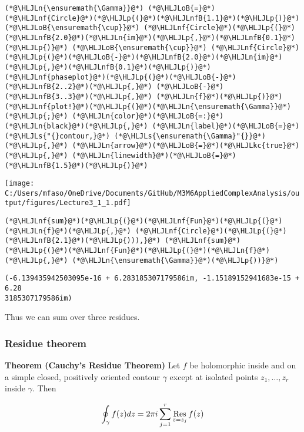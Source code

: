 \documentclass[12pt,landscape]{article}
\newcommand{\HLJLkc}[1]{\textcolor[RGB]{59,151,46}{\textit{#1}}}
\newcommand{\HLJLn}[1]{#1}
\newcommand{\HLJLnf}[1]{\textcolor[RGB]{66,102,213}{#1}}
\newcommand{\HLJLs}[1]{\textcolor[RGB]{201,61,57}{#1}}
\newcommand{\HLJLnfB}[1]{\textcolor[RGB]{59,151,46}{#1}}
\newcommand{\HLJLoB}[1]{\textcolor[RGB]{102,102,102}{\textbf{#1}}}
\newcommand{\HLJLp}[1]{#1}
\def\cent#1{\begin{center}#1\end{center} }
\begin{document}
{\begin{lstlisting}
(*@\HLJLn{\ensuremath{\Gamma}}@*) (*@\HLJLoB{=}@*) (*@\HLJLnf{Circle}@*)(*@\HLJLp{(}@*)(*@\HLJLnfB{1.1}@*)(*@\HLJLp{)}@*) (*@\HLJLoB{\ensuremath{\cup}}@*) (*@\HLJLnf{Circle}@*)(*@\HLJLp{(}@*)(*@\HLJLnfB{2.0}@*)(*@\HLJLn{im}@*)(*@\HLJLp{,}@*)(*@\HLJLnfB{0.1}@*)(*@\HLJLp{)}@*) (*@\HLJLoB{\ensuremath{\cup}}@*) (*@\HLJLnf{Circle}@*)(*@\HLJLp{(}@*)(*@\HLJLoB{-}@*)(*@\HLJLnfB{2.0}@*)(*@\HLJLn{im}@*)(*@\HLJLp{,}@*)(*@\HLJLnfB{0.1}@*)(*@\HLJLp{)}@*)
(*@\HLJLnf{phaseplot}@*)(*@\HLJLp{(}@*)(*@\HLJLoB{-}@*)(*@\HLJLnfB{2..2}@*)(*@\HLJLp{,}@*) (*@\HLJLoB{-}@*)(*@\HLJLnfB{3..3}@*)(*@\HLJLp{,}@*) (*@\HLJLn{f}@*)(*@\HLJLp{)}@*)
(*@\HLJLnf{plot!}@*)(*@\HLJLp{(}@*)(*@\HLJLn{\ensuremath{\Gamma}}@*)(*@\HLJLp{;}@*) (*@\HLJLn{color}@*)(*@\HLJLoB{=:}@*)(*@\HLJLn{black}@*)(*@\HLJLp{,}@*) (*@\HLJLn{label}@*)(*@\HLJLoB{=}@*)(*@\HLJLs{"{}contour,}@*) (*@\HLJLs{\ensuremath{\Gamma}"{}}@*)(*@\HLJLp{,}@*) (*@\HLJLn{arrow}@*)(*@\HLJLoB{=}@*)(*@\HLJLkc{true}@*)(*@\HLJLp{,}@*) (*@\HLJLn{linewidth}@*)(*@\HLJLoB{=}@*)(*@\HLJLnfB{1.5}@*)(*@\HLJLp{)}@*)
\end{lstlisting}

\cent{\texttt{[image: C:/Users/mfaso/OneDrive/Documents/GitHub/M3M6AppliedComplexAnalysis/output/figures/Lecture3\_1\_1.pdf]}}

\begin{lstlisting}
(*@\HLJLnf{sum}@*)(*@\HLJLp{(}@*)(*@\HLJLnf{Fun}@*)(*@\HLJLp{(}@*)(*@\HLJLn{f}@*)(*@\HLJLp{,}@*) (*@\HLJLnf{Circle}@*)(*@\HLJLp{(}@*)(*@\HLJLnfB{2.1}@*)(*@\HLJLp{))),}@*) (*@\HLJLnf{sum}@*)(*@\HLJLp{(}@*)(*@\HLJLnf{Fun}@*)(*@\HLJLp{(}@*)(*@\HLJLn{f}@*)(*@\HLJLp{,}@*) (*@\HLJLn{\ensuremath{\Gamma}}@*)(*@\HLJLp{))}@*)
\end{lstlisting}

\begin{lstlisting}
(-6.139435942503095e-16 + 6.283185307179586im, -1.15189152941683e-15 + 6.28
3185307179586im)
\end{lstlisting}


Thus we can sum over three residues.

\subsubsection{Residue theorem}
\textbf{Theorem (Cauchy's Residue Theorem)} Let $f$ be holomorphic inside and on a simple closed, positively oriented contour $\gamma$ except at isolated points $z_1, \ldots, z_r$ inside $\gamma$. Then

\[
\oint_\gamma f(z) dz = 2 \pi i \sum_{j=1}^r {\underset{z = z_j}{\rm Res}}\, f(z)
\]
}
\end{document}
